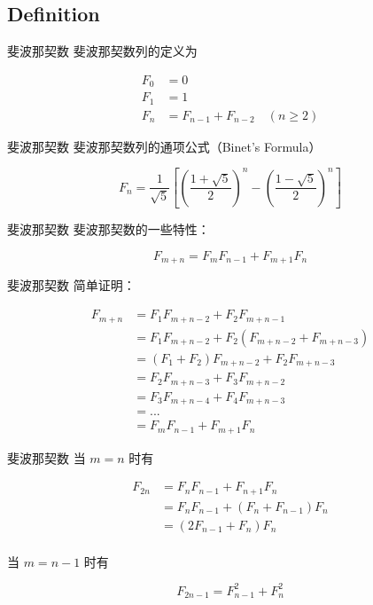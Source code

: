 \documentclass[12pt,aspectratio=169]{beamer}
\begin{document}
\subsection[斐波那契数]{Definition}

\begin{frame}[fragile]{斐波那契数}
斐波那契数列的定义为

$$
\begin{aligned}
F_0 &= 0 \\
F_1 &= 1 \\
F_n &= F_{n-1} + F_{n-2} \quad (n \ge 2)
\end{aligned}
$$
\end{frame}

\begin{frame}[fragile]{斐波那契数}
斐波那契数列的通项公式（Binet's Formula）

$$
F_n = \frac{1}{\sqrt{5}}\left[\left(\frac{1+\sqrt{5}}{2}\right)^n - \left(\frac{1-\sqrt{5}}{2}\right)^n\right]
$$
\end{frame}

\begin{frame}[fragile]{斐波那契数}
斐波那契数的一些特性：

$$
F_{m+n} = F_{m} F_{n-1} + F_{m+1} F_{n}
$$
\end{frame}

\begin{frame}[fragile]{斐波那契数}
简单证明：

$$
\begin{aligned}
F_{m+n} &= F_{1} F_{m+n-2} + F_{2} F_{m+n-1} \\
&= F_{1} F_{m+n-2} + F_{2} (F_{m+n-2} + F_{m+n-3}) \\
&= (F_{1} + F_{2}) F_{m+n-2} + F_{2} F_{m+n-3} \\
&= F_{2} F_{m+n-3} + F_{3} F_{m+n-2} \\
&= F_{3} F_{m+n-4} + F_{4} F_{m+n-3} \\
&= ... \\
&= F_{m} F_{n-1} + F_{m+1} F_{n}
\end{aligned}
$$
\end{frame}

\begin{frame}[fragile]{斐波那契数}
  当 $m = n$ 时有

  $$
  \begin{aligned}
  F_{2n} &= F_{n} F_{n-1} + F_{n+1} F_{n} \\
  &= F_{n} F_{n-1} + (F_{n} + F_{n-1}) F_{n} \\
  &= (2 F_{n-1} + F_{n}) F_{n} \\
  \end{aligned}
  $$

  当 $m = n-1$ 时有

  $$
  F_{2n-1} = F_{n-1}^2 + F_{n}^2
  $$
\end{frame}
\end{document}
